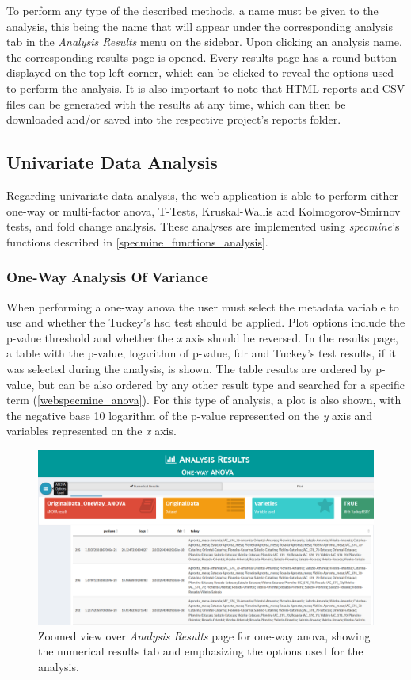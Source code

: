 To perform any type of the described methods, a name must be given to the analysis, this being the name that will appear under the corresponding analysis tab in the \textit{Analysis Results} menu on the sidebar. Upon clicking an analysis name, the corresponding results page is opened. Every results page has a round button displayed on the top left corner, which can be clicked to reveal the options used to perform the analysis. It is also important to note that HTML reports and CSV files can be generated with the results at any time, which can then be downloaded and/or saved into the respective project's reports folder. 


\subsection{Univariate Data Analysis}

Regarding univariate data analysis, the web application is able to perform either one-way or multi-factor \gls{anova}, T-Tests, Kruskal-Wallis and Kolmogorov-Smirnov tests, and fold change analysis. These analyses are implemented  using \textit{specmine}'s functions described in \autoref{specmine_functions_analysis}. 

\subsubsection{One-Way Analysis Of Variance}

When performing a one-way \gls{anova} the user must select the metadata variable to use and whether the Tuckey's \gls{hsd} test should be applied. Plot options include the p-value threshold and whether the \textit{x} axis should be reversed. In the results page, a table with the p-value, logarithm of p-value, \gls{fdr} and Tuckey's test results, if it was selected during the analysis, is shown. The table results are ordered by p-value, but can be also ordered by any other result type and searched for a specific term (\autoref{webspecmine_anova}). For this type of analysis, a plot is also shown, with the negative base 10 logarithm of the p-value represented on the \textit{y} axis and variables represented on the \textit{x} axis. 

\begin{figure}[h]
	\centering
	\includegraphics[width=1\linewidth]{Imagens/webspecmine_anova}
	\caption{Zoomed view over \textit{Analysis Results} page for one-way \gls{anova}, showing the numerical results tab and emphasizing the options used for the analysis.}
	\label{webspecmine_anova}
\end{figure}

